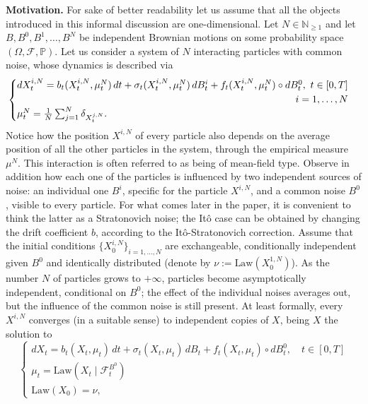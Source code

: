 \documentclass[10pt, a4paper]{article} %
\theoremstyle{definition}
\theoremstyle{plain}
\begin{document}
\textbf{Motivation. } For sake of better readability let us assume that all the objects introduced in this informal discussion are one-dimensional. 
Let $N \in \mathbb{N}_{\ge 1}$ and let $B,B^0,B^1,\dots,B^N$ be independent Brownian motions on some probability space $(\Omega,\mathcal{F},\mathbb{P})$. 
Let us consider a system of $N$ interacting particles with common noise, whose dynamics is described via \begin{equation*}
    \begin{cases}
        dX^{i,N}_t = b_t(X^{i,N}_t, \mu^N_t) \, dt + \sigma_t (X^{i,N}_t, \mu^N_t) \, dB^i_t + f_t (X^{i,N}_t, \mu^N_t) \circ dB^0_t, \ t \in [0,T] \\ \hfill i=1,\dots,N \\
        \mu^N_t = \frac{1}{N} \sum_{j=1}^N \delta_{X^{j,N}_t} .        %
    \end{cases}
\end{equation*}
Notice how the position $X^{i,N}$ of every particle also depends on the average position of all the other particles in the system, through the empirical measure $\mu^N$. This interaction is often referred to as being of mean-field type. 
Observe in addition how each one of the particles is influenced by two independent sources of noise: an individual one $B^i$, specific for the particle $X^{i,N}$, and a common noise $B^0$, visible to every particle. 
For what comes later in the paper, it is convenient to think the latter as a Stratonovich noise; the It\^o case can be obtained by changing the drift coefficient $b$, 
according to the It\^o-Stratonovich correction. 
Assume that the initial conditions $\{X^{i,N}_0\}_{i=1,\dots,N}$ are exchangeable, conditionally independent given $B^0$ and identically distributed (denote by $\nu:=\text{Law}(X_0^{1,N})$). 
As the number $N$ of particles grows to $+\infty$, particles become  asymptotically independent, conditional on $B^0$; the effect of the individual noises averages out, but the influence of the common noise is still present. 
At least formally, every $X^{i,N}$ converges (in a suitable sense) to independent copies of $X$, being $X$ the solution to 
\begin{equation} \label{eq:McKeanVlasovSDE_intro}
    \begin{cases}
        dX_t = b_t(X_t, \mu_t) \, dt + \sigma_t (X_t, \mu_t) \, dB_t + f_t (X_t, \mu_t)  \circ dB^0_t, \quad t \in [0,T] \\
        \mu_t = \text{Law}(X_t \mid \mathcal{F}_t^{B^0})  \\
        \text{Law}(X_0) = \nu , 
    \end{cases}
\end{equation}
\end{document}
